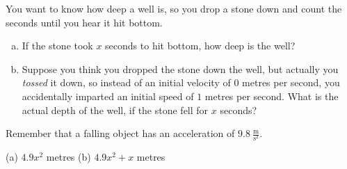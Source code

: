 \begin{Mquestion}
You want to know how deep a well is, so you drop a stone down and count the seconds until you hear it hit bottom.
\begin{enumerate}[(a)]
\item If the stone took $x$ seconds to hit bottom, how deep is the well?
\item Suppose you think you dropped the stone down the well, but actually you \emph{tossed} it down, so instead of an initial velocity of 0 metres per second, you accidentally imparted an initial speed of $1$ metres per second. What is the actual depth of the well, if the stone fell for $x$ seconds?
\end{enumerate}
\end{Mquestion}
\begin{hint}
Remember that a falling object has an acceleration of $9.8~\frac{\mathrm{m}}{\mathrm{s}^2}$.
\end{hint}
\begin{answer}
(a) $4.9x^2$ metres \qquad (b) $4.9x^2+x$ metres
\end{answer}
